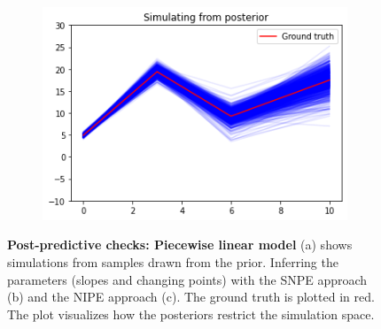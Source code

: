 \documentclass[12pt]{extreport}
\begin{document}
\begin{figure}
\begin{subfigure}{.32\textwidth}
        \centering
        \includegraphics[width=1.\linewidth]{piecewise_ppc_incremental_final.png}
    \end{subfigure}
    
\caption{\label{piecewise}\textbf{Post-predictive checks: Piecewise linear model} \small (a) shows simulations from samples drawn from the prior. Inferring the parameters (slopes and changing points) with the SNPE approach (b) and the NIPE approach (c). The ground truth is plotted in red. The plot visualizes how the posteriors restrict the simulation space.}
  

\end{figure}
\end{document}
